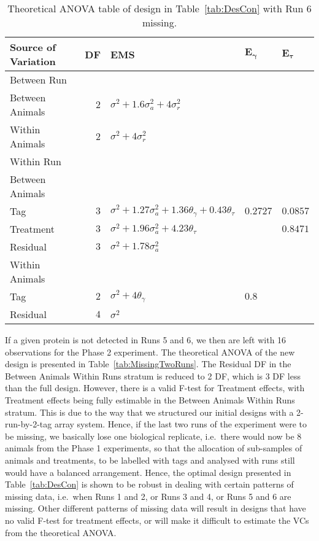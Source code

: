 \begin{table}[!ht]
\centering
 \caption{Theoretical ANOVA table of design in Table~\ref{tab:DesCon} with Run 6 missing.}
\begin{tabular}[t]{lrlll} 
\toprule 
\multicolumn{1}{l}{\textbf{Source of Variation}} & \multicolumn{1}{l}{\textbf{DF}} & \multicolumn{1}{l}{\textbf{EMS}}&\multicolumn{1}{l}{$\bm{E_{\gamma }}$}&\multicolumn{1}{l}{$\bm{E_{\tau}}$}\\ 
\midrule 
Between Run &  &  & & \\ 
\quad Between Animals & $2$ & $\sigma^2+ 1.6\sigma_{a}^2+4\sigma_{r}^2$ & & \\ 
\quad Within Animals & $2$ & $\sigma^2+4\sigma_{r}^2$ & & \\ \hline 
Within Run &  &  & & \\ 
\quad Between Animals &  &  & & \\ 
\quad \quad Tag & $3$ & $\sigma^2+1.27\sigma_{a}^2+1.36\theta_{\gamma}+0.43\theta_{\tau}$ &$0.2727$ & $0.0857$\\ 
\quad \quad Treatment & $3$ & $\sigma^2+1.96\sigma_{a}^2+4.23\theta_{\tau}$ & & $0.8471$\\ 
\quad \quad Residual & $3$ & $\sigma^2+1.78\sigma_{a}^2$ & & \\ \hline 
\quad Within Animals &  &  & & \\ 
\quad \quad Tag & $2$ & $\sigma^2+4\theta_{\gamma}$ &$0.8$ & \\ 
\quad \quad Residual & $4$ & $\sigma^2$ & & \\ 
\bottomrule 
 \end{tabular} 
 \label{tab:MissingOneRun} 
\end{table}

If a given protein is not detected in Runs 5 and 6, we then are left with 16 observations for the Phase 2 experiment. The theoretical ANOVA of the new design is presented in Table~\ref{tab:MissingTwoRuns}. The Residual DF in the Between Animals Within Runs stratum is reduced to 2 DF, which is 3 DF less than the full design. However, there is a valid F-test for Treatment effects, with Treatment effects being fully estimable in the Between Animals Within Runs stratum. This is due to the way that we structured our initial designs with a 2-run-by-2-tag array system. Hence, if the last two runs of the experiment were to be missing, we basically lose one biological replicate, i.e.\ there would now be 8 animals from the Phase 1 experiments, so that the allocation of sub-samples of animals and treatments, to be labelled with tags and analysed with runs still would have a balanced arrangement. Hence, the optimal design presented in Table~\ref{tab:DesCon} is shown to be robust in dealing with certain patterns of missing data, i.e.\ when Runs 1 and 2, or Runs 3 and 4, or Runs 5 and 6 are missing. Other different patterns of missing data will result in designs that have no valid F-test for treatment effects, or will make it difficult to estimate the VCs from the theoretical ANOVA.   

